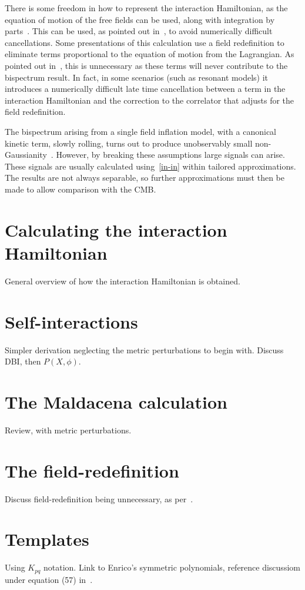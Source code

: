 There is some freedom in how to represent the interaction Hamiltonian,
as the equation of motion of the free fields can be used, along with integration by parts~\cite{rp_integ_by_parts}.
This can be used, as pointed out in~\cite{Funakoshi}, to avoid numerically difficult cancellations.
Some presentations of this calculation use a field redefinition to eliminate terms
proportional to the equation of motion from the Lagrangian.
As pointed out in~\cite{px_burrage},
this is unnecessary as these terms will never contribute to the bispectrum result.
In fact, in some scenarios (such as resonant models) it introduces a numerically difficult
late time cancellation between a term in the interaction Hamiltonian and the
correction to the correlator that adjusts for the field redefinition.


The bispectrum arising from a single field inflation model,
with a canonical kinetic term, slowly rolling, turns out to produce
unobservably small non-Gaussianity~\cite{Maldacena}.
However, by breaking these assumptions large signals can arise.
These signals are usually calculated using~\eqref{in-in} within tailored approximations.
The results are not always separable, so further approximations must then be made to
allow comparison with the CMB.
    \section{Calculating the interaction Hamiltonian}
    General overview of how the interaction Hamiltonian is obtained.
    \newpage
    \section{Self-interactions}
    Simpler derivation neglecting the metric perturbations to begin with.
    \newpage
    Discuss DBI, then $P(X, \phi)$.
    \newpage
    \section{The Maldacena calculation}
    Review, with metric perturbations.
    \newpage
    \section{The field-redefinition}
    Discuss field-redefinition being unnecessary, as per~\cite{px_burrage}.
    \newpage
    \section{Templates}
    Using $K_{pq}$ notation.
    Link to Enrico's symmetric polynomials, reference discussiom under
    equation (57) in~\cite{Fergusson_2010}.
    \newpage
